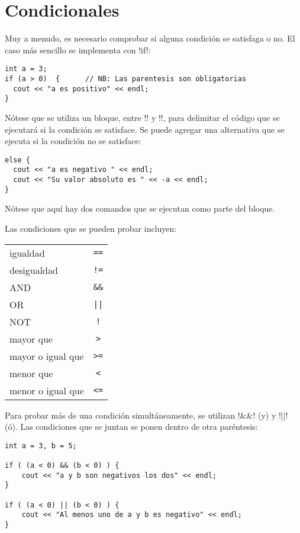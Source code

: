 \section{Condicionales}

Muy a menudo, es necesario comprobar si alguna condición se satisfaga o no.
El caso más sencillo se implementa con \inl!if!:
\begin{lstlisting}
int a = 3; 
if (a > 0)  {      // NB: Las parentesis son obligatorias
  cout << "a es positivo" << endl; 
}
\end{lstlisting}
Nótese que se utiliza un bloque, entre \inl!{! y \inl!}!, para delimitar el
código que se ejecutará si la condición se satisface.
Se puede agregar una alternativa que se ejecuta si la condición no se satisface:
\begin{lstlisting}
else {
  cout << "a es negativo " << endl;
  cout << "Su valor absoluto es " << -a << endl;
}
\end{lstlisting}
Nótese que aquí hay dos comandos que se ejecutan como parte del bloque.

Las condiciones que se pueden probar incluyen:
\begin{center}
\begin{tabular}{|l|c|}
\hline
igualdad & \verb!==! \\
desigualdad & \verb/!=/ \\
AND & \verb!&&! \\
OR & \verb!||! \\
NOT & \verb/!/ \\
mayor que & \verb!>! \\
mayor o igual que & \verb!>=! \\
menor que & \verb!<! \\
menor o igual que & \verb!<=! \\
\hline 
\end{tabular}
\end{center}

Para probar más de una condición simultáneamente, se utilizan \inl!&&!  
(y) y \inl!||! (ó).   Las condiciones que se juntan se ponen dentro de
otra paréntesis:

\begin{lstlisting}
int a = 3, b = 5;

if ( (a < 0) && (b < 0) ) {
	cout << "a y b son negativos los dos" << endl;
}

if ( (a < 0) || (b < 0) ) {
	cout << "Al menos uno de a y b es negativo" << endl;
}
\end{lstlisting}



